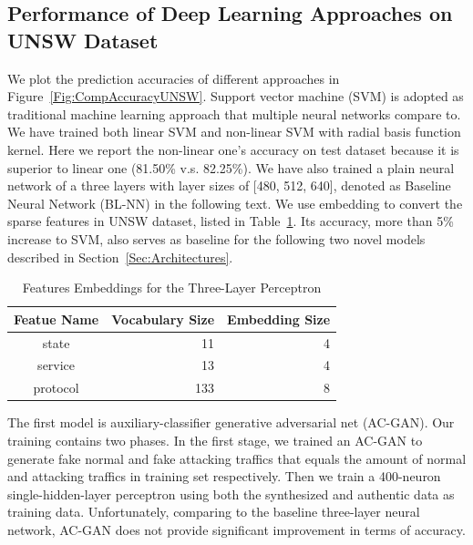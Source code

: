 \subsection{Performance of Deep Learning Approaches on UNSW Dataset} 
We plot the prediction accuracies of different approaches in Figure~\ref{Fig:CompAccuracyUNSW}.
Support vector machine (SVM) is adopted as traditional machine learning approach that multiple neural networks compare to.
We have trained both linear SVM and non-linear SVM with radial basis function kernel.
Here we report the non-linear one's
accuracy on test dataset because it is superior to linear one (81.50\% v.s. 82.25\%).
We have also trained a plain neural network of a three layers with layer sizes of [480, 512, 640],
denoted as Baseline Neural Network (BL-NN) in the following text.
We use embedding to convert the sparse features in UNSW dataset, listed in Table~\ref{Tab:SparseFeatures}.
Its accuracy, more than 5\% increase to SVM, also serves as baseline for the following two novel models
described in Section~\ref{Sec:Architectures}.
\begin{table}[]
\centering
\caption{Features Embeddings for the Three-Layer Perceptron}
\label{Tab:SparseFeatures}
\begin{tabular}{c|r|r}
Featue Name & \multicolumn{1}{c|}{Vocabulary Size} & \multicolumn{1}{c}{Embedding Size} \\
\hline
\hline
state       & 11                                  & 4                                  \\
service     & 13                                  & 4                                  \\
protocol    & 133                                 & 8                                 
\end{tabular}
\end{table}

The first model is auxiliary-classifier generative adversarial net (AC-GAN).
Our training contains two phases. In the first stage, we trained an AC-GAN to generate fake
normal and fake attacking traffics that equals the amount of normal and attacking traffics in training set respectively.
Then we train a 400-neuron single-hidden-layer perceptron using both the synthesized and authentic data as training data.
Unfortunately, comparing to the baseline three-layer neural network, AC-GAN does not provide significant
improvement in terms of accuracy.

